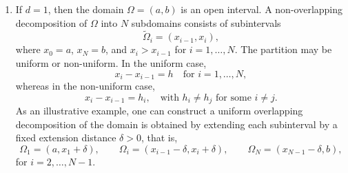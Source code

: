 \begin{enumerate}[label=(\arabic*)]
\item If $d = 1$, then the domain $\Omega = (a,b)$ is an open interval. A non-overlapping decomposition of $\Omega$ into $N$ subdomains 
consists of subintervals 
\begin{equation*}
    \widetilde{\Omega}_i = (x_{i-1}, x_i),
\end{equation*}
where $x_0 = a$, $x_N = b$, and $x_i > x_{i-1}$ for $i = 1, \ldots, N$.
The partition may be uniform or non-uniform. In the uniform case,
\begin{equation*}
    x_i - x_{i-1} = h \quad \text{for } i = 1, \ldots, N,
\end{equation*}
whereas in the non-uniform case,
\begin{equation*}
    x_i - x_{i-1} = h_i, \quad \text{with } h_i \neq h_j \text{ for some } i \neq j.
\end{equation*}
As an illustrative example, one can construct a uniform overlapping decomposition of the domain is obtained by extending each subinterval by a fixed extension distance $\delta > 0$, that is,
\begin{equation*}
    \Omega_1 = (a, x_1 + \delta), \qquad \Omega_i = (x_{i-1} - \delta, x_i + \delta), \qquad \Omega_N = (x_{N-1} - \delta, b),
\end{equation*}
for $i = 2, \ldots, N-1$.


\end{enumerate}

